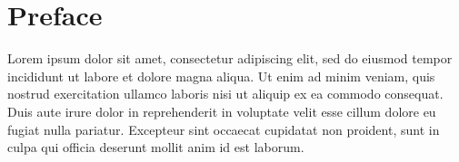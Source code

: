 \chapter*{Preface}

Lorem ipsum dolor sit amet, consectetur adipiscing elit, sed do eiusmod tempor incididunt ut 
labore et dolore magna aliqua. Ut enim ad minim veniam, quis nostrud exercitation ullamco 
laboris nisi ut aliquip ex ea commodo consequat. Duis aute irure dolor in reprehenderit in 
voluptate velit esse cillum dolore eu fugiat nulla pariatur. Excepteur sint occaecat cupidatat 
non proident, sunt in culpa qui officia deserunt mollit anim id est laborum.
